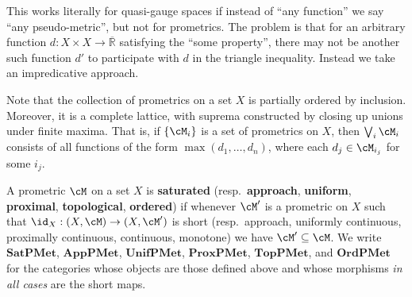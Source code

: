 \documentclass{article}
\def\Qp{\mathbb{Q}^+}
\def\R{\mathbb{R}}
\def\Re{\overline{\R}}
\def\TopPMet{\mathbf{TopPMet}}
\def\UnifPMet{\mathbf{UnifPMet}}
\def\ProxPMet{\mathbf{ProxPMet}}
\def\AppPMet{\mathbf{AppPMet}}
\def\OrdPMet{\mathbf{OrdPMet}}
\def\SatPMet{\mathbf{SatPMet}}
\begin{document}
This works literally for quasi-gauge spaces if instead of ``any function'' we say ``any pseudo-metric'', but not for prometrics.
The problem is that for an arbitrary function $d:X\times X \to \Re$ satisfying the ``some property'', there may not be another such function $d'$ to participate with $d$ in the triangle inequality.
Instead we take an impredicative approach.

Note that the collection of prometrics on a set $X$ is partially ordered by inclusion.
Moreover, it is a complete lattice, with suprema constructed by closing up unions under finite maxima.
That is, if $\{\cM_i\}$ is a set of prometrics on $X$, then $\bigvee_i \cM_i$ consists of all functions of the form $\max(d_1,\dots,d_n)$, where each $d_j \in \cM_{i_j}$ for some $i_j$.

\begin{defn}
  A prometric $\cM$ on a set $X$ is \textbf{saturated} (resp.\ \textbf{approach}, \textbf{uniform}, \textbf{proximal}, \textbf{topological}, \textbf{ordered}) if whenever $\cM'$ is a prometric on $X$ such that $\id_X:(X,\cM) \to (X,\cM')$ is short (resp.\ approach, uniformly continuous, proximally continuous, continuous, monotone) we have $\cM'\subseteq \cM$.
  We write $\SatPMet$, $\AppPMet$, $\UnifPMet$, $\ProxPMet$, $\TopPMet$, and $\OrdPMet$ for the categories whose objects are those defined above and whose morphisms \emph{in all cases} are the short maps.
\end{defn}
\end{document}

